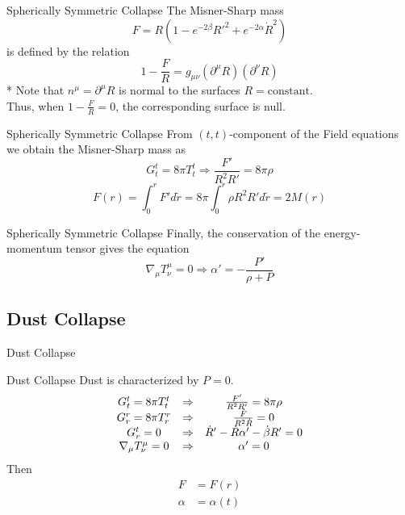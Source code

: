 \documentclass{beamer}
\begin{document}
\begin{darkframes}
\begin{frame}{Spherically Symmetric Collapse}
	The Misner-Sharp mass
    $$F = R \left( 1 - e^{-2\beta} R'^2 + e^{-2\alpha} \dot{R}^2  \right)$$
    is defined by the relation
    $$1 - \frac{F}{R} = g_{\mu\nu} \left( \partial^\mu R \right) \left( \partial^\nu R \right)$$
    \pause
    \footnotesize
    * Note that $n^\mu = \partial^\mu R$ is normal to the surfaces $R = \textrm{constant}$.\\ 
    Thus, when $1 - \frac{F}{R} = 0$, the corresponding surface is null.
\end{frame}

\begin{frame}{Spherically Symmetric Collapse}
	From $(t,t)$-component of the Field equations we obtain the Misner-Sharp mass as
    $$G^t_t = 8\pi T^t_t \Rightarrow \frac{F'}{R^2 R'} = 8\pi \rho$$
    \pause
    $$ F(r) = \int_0^r F' d\tilde{r} = 8\pi \int_0^r \rho R^2 R' d\tilde{r} = 2M(r) $$
\end{frame}
     
\begin{frame}{Spherically Symmetric Collapse}
	Finally, the conservation of the energy-momentum tensor gives the equation
    $$\nabla_\mu T^\mu _\nu = 0 \Rightarrow \alpha'= - \frac{P'}{\rho + P}$$
\end{frame}

\subsection{Dust Collapse}
\begin{frame}
	\huge
	Dust Collapse
\end{frame}

\begin{frame}{Dust Collapse}
	Dust is characterized by $P=0$.
    \pause
	$$
    \begin{array}{c c c}
    G^t_t = 8\pi T^t_t &\Rightarrow &\frac{F'}{R^2 R'} = 8\pi \rho \\
    G^r_r = 8\pi T^r_r &\Rightarrow &\frac{\dot{F}}{R^2 \dot{R}} = 0 \\
   	G^t_r = 0 &\Rightarrow & \dot{R}'-\dot{R} \alpha'-\dot{\beta} R' =0 \\
    \nabla_\mu T^\mu _\nu = 0 &\Rightarrow &\alpha'= 0
    \end{array}
    $$
    \pause
    Then
    \begin{align*}
    F &= F(r)\\
    \alpha &= \alpha(t)
    \end{align*}
\end{frame}


\end{darkframes}
\end{document}
